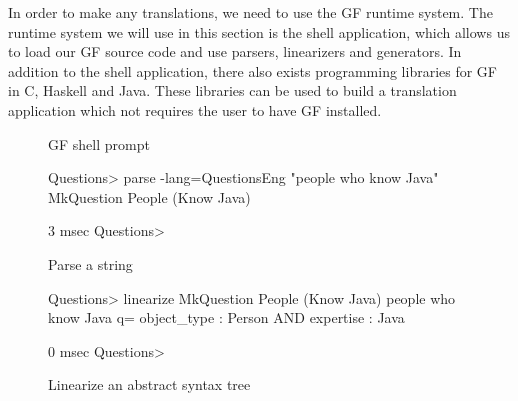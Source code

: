 In order to make any translations, we need to use the GF runtime system. The  runtime system we will use in this section is the shell application, which allows us to load our GF source code and use parsers, linearizers and generators. In addition to the shell application, there also exists programming libraries for GF in C, Haskell and Java. These libraries can be used to build a translation application which not requires the user to have GF installed.

\begin{figure}[H]

\caption{GF shell prompt}
\end{figure}

\begin{figure}[H]
\begin{terminal}
Questions> parse -lang=QuestionsEng "people who know Java"
MkQuestion People (Know Java)

3 msec
Questions> 
\end{terminal}

\caption{Parse a string}
\end{figure}

\begin{figure}[H]
\begin{terminal}
Questions> linearize MkQuestion People (Know Java)
people who know Java
q= object_type : Person AND expertise : Java


0 msec
Questions> 
\end{terminal}

\caption{Linearize an abstract syntax tree}
\end{figure}

